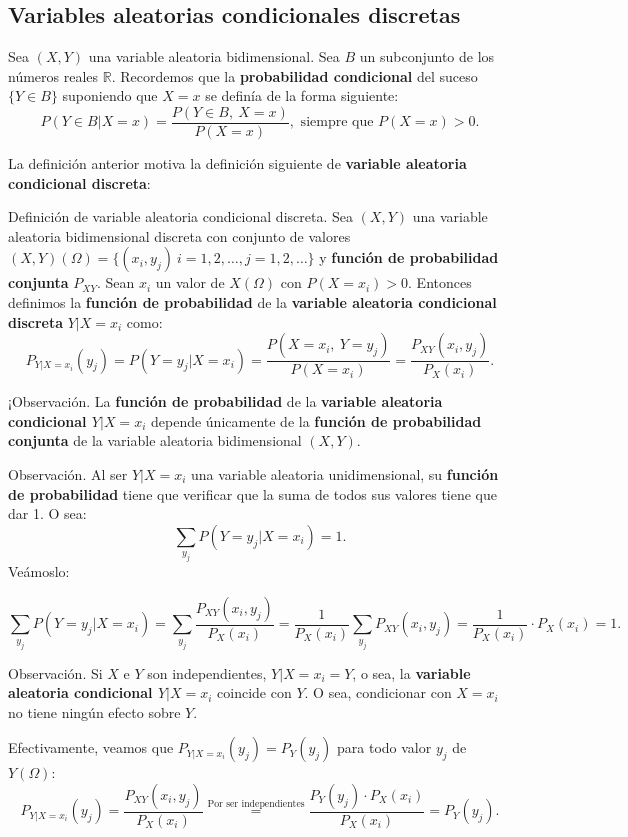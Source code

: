 \documentclass[]{book}
\begin{document}
\hypertarget{variables-aleatorias-condicionales-discretas}{%
\subsection{Variables aleatorias condicionales discretas}\label{variables-aleatorias-condicionales-discretas}}

Sea \((X,Y)\) una variable aleatoria bidimensional. Sea \(B\) un subconjunto de los números reales \(\mathbb{R}\). Recordemos que la \textbf{probabilidad condicional} del suceso \(\{Y\in B\}\) suponiendo que \(X=x\) se definía de la forma siguiente:
\[
P(Y\in B|X=x)=\frac{P(Y\in B,\ X=x)}{P(X=x)}, \mbox{ siempre que }P(X=x)>0.
\]

La definición anterior motiva la definición siguiente de \textbf{variable aleatoria condicional discreta}:

Definición de variable aleatoria condicional discreta.
Sea \((X,Y)\) una variable aleatoria bidimensional discreta con conjunto de valores \((X,Y)(\Omega)=\{(x_i,y_j)\ i=1,2,\ldots, j=1,2,\ldots\}\) y \textbf{función de probabilidad conjunta} \(P_{XY}\). Sean \(x_i\) un valor de \(X(\Omega)\) con \(P(X=x_i)>0\). Entonces definimos la \textbf{función de probabilidad} de la \textbf{variable aleatoria condicional discreta} \(Y|X=x_i\) como:
\[
P_{Y|X=x_i}(y_j)=P(Y=y_j|X=x_i)=\frac{P(X=x_i,\ Y=y_j)}{P(X=x_i)}=\frac{P_{XY}(x_i,y_j)}{P_X(x_i)}.
\]

¡Observación.
La \textbf{función de probabilidad} de la \textbf{variable aleatoria condicional \(Y|X=x_i\)} depende únicamente de la \textbf{función de probabilidad conjunta} de la variable aleatoria bidimensional \((X,Y)\).

Observación.
Al ser \(Y|X=x_i\) una variable aleatoria unidimensional, su \textbf{función de probabilidad} tiene que verificar que la suma de todos sus valores tiene que dar 1. O sea:
\[
\sum_{y_j} P(Y=y_j|X=x_i)=1.
\]
Veámoslo:

\[
\sum_{y_j} P(Y=y_j|X=x_i)=\sum_{y_j} \frac{P_{XY}(x_i,y_j)}{P_X(x_i)}=\frac{1}{P_X(x_i)}\sum_{y_j} P_{XY}(x_i,y_j) =\frac{1}{P_X(x_i)}\cdot P_X(x_i)=1.
\]

Observación.
Si \(X\) e \(Y\) son independientes, \(Y|X=x_i =Y\), o sea, la \textbf{variable aleatoria condicional \(Y|X=x_i\)} coincide con \(Y\). O sea, condicionar con \(X=x_i\) no tiene ningún efecto sobre \(Y\).

Efectivamente, veamos que \(P_{Y|X=x_i}(y_j)=P_Y(y_j)\) para todo valor \(y_j\) de \(Y(\Omega)\):
\[
P_{Y|X=x_i}(y_j) =\frac{P_{XY}(x_i,y_j)}{P_X(x_i)} \stackrel{\mbox{Por ser independientes}}{=}\frac{P_Y(y_j)\cdot P_X(x_i)}{P_X(x_i)}=P_Y(y_j).
\]
\end{document}
